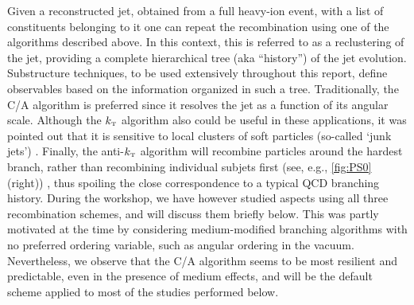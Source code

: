 Given a reconstructed jet, obtained from a full heavy-ion event, with a list of constituents belonging to it
one can repeat the recombination using one of the algorithms described above. 
In this context, this is referred to as a reclustering of the jet, providing a complete hierarchical tree (aka ``history'') of the jet evolution. Substructure techniques, to be used extensively throughout this report, define observables based on the information organized in such a tree. 
Traditionally, the C/A algorithm is preferred since it resolves the jet as a function of its angular scale. Although the $k_{\text{\tiny T}}$ algorithm also could be useful in these applications, it was pointed out that it is sensitive to local clusters of soft particles (so-called `junk jets') \cite{Dokshitzer:1997in}. Finally, the anti-$k_{\text{\tiny T}}$ algorithm will recombine particles around the hardest branch, rather than recombining individual subjets first (see, e.g., \autoref{fig:PS0} (right)) \cite{Salam:2009jx}, thus spoiling the close correspondence to a typical QCD branching history. 
During the workshop, we have however studied aspects using all three recombination schemes, and will discuss them briefly below. This was partly motivated at the time by considering medium-modified branching algorithms with no preferred ordering variable, such as angular ordering in the vacuum. Nevertheless, we observe that the C/A algorithm seems to be most resilient and predictable, even in the presence of medium effects, and will be the default scheme applied to most of the studies performed below.


